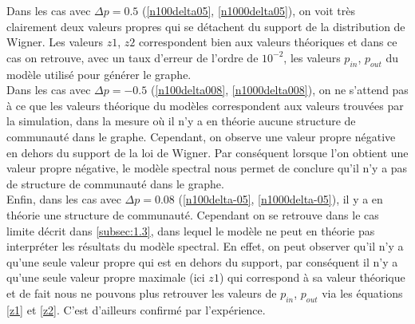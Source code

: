 Dans les cas avec $\Delta p = 0.5$ (\ref{n100delta05}, \ref{n1000delta05}), on voit très clairement deux valeurs propres qui se détachent du support de la distribution de Wigner.
Les valeurs $z1$, $z2$ correspondent bien aux valeurs théoriques et dans ce cas on retrouve, avec un taux d'erreur de l'ordre de $10^{-2}$, les valeurs $p_{in}$, $p_{out}$ du modèle utilisé pour générer le graphe.\\
Dans les cas avec $\Delta p = -0.5$ (\ref{n100delta008}, \ref{n1000delta008}), on ne s'attend pas à ce que les valeurs théorique du modèles correspondent aux valeurs trouvées par la simulation, dans la mesure où il n'y a en théorie aucune structure de communauté dans le graphe.
Cependant, on observe une valeur propre négative en dehors du support de la loi de Wigner.
Par conséquent lorsque l'on obtient une valeur propre négative, le modèle spectral nous permet de conclure qu'il n'y a pas de structure de communauté dans le graphe.\\
Enfin, dans les cas avec $\Delta p = 0.08$ (\ref{n100delta-05}, \ref{n1000delta-05}), il y a en théorie une structure de communauté. 
Cependant on se retrouve dans le cas limite décrit dans \autoref{subsec:1.3}, dans lequel le modèle ne peut en théorie pas interpréter les résultats du modèle spectral.
En effet, on peut observer qu'il n'y a qu'une seule valeur propre qui est en dehors du support, par conséquent il n'y a qu'une seule valeur propre maximale (ici $z1$) qui correspond à sa valeur théorique et de fait nous ne pouvons plus retrouver les valeurs de $p_{in}$, $p_{out}$ via les équations \eqref{z1} et \eqref{z2}.
C'est d'ailleurs confirmé par l'expérience. 

